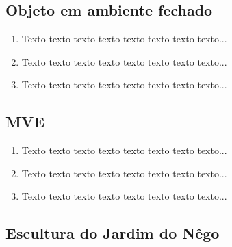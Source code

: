 \documentclass[table, usenames, svgnames, xcolor=dvipsnames]{beamer}
\begin{document}
\subsection{Objeto em ambiente fechado}

\begin{frame}
	\begin{enumerate}
    	\item Texto texto texto texto texto texto texto texto...
		\\[0.5em]

    	\item Texto texto texto texto texto texto texto texto...
		\\[0.5em]
    	
		\item Texto texto texto texto texto texto texto texto...
		\\[0.5em]
	\end{enumerate}
\end{frame}


\subsection{MVE}

\begin{frame}
	\begin{enumerate}
    	\item Texto texto texto texto texto texto texto texto...
		\\[0.5em]

    	\item Texto texto texto texto texto texto texto texto...
		\\[0.5em]
    	
		\item Texto texto texto texto texto texto texto texto...
		\\[0.5em]
	\end{enumerate}
\end{frame}

\subsection{Escultura do Jardim do Nêgo}
\end{document}
